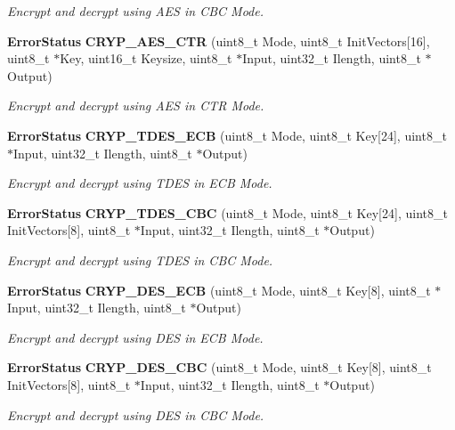 \begin{DoxyCompactItemize}
\begin{DoxyCompactList}\small\item\em Encrypt and decrypt using A\+ES in C\+BC Mode. \end{DoxyCompactList}\item 
\textbf{ Error\+Status} \textbf{ C\+R\+Y\+P\+\_\+\+A\+E\+S\+\_\+\+C\+TR} (uint8\+\_\+t Mode, uint8\+\_\+t Init\+Vectors[16], uint8\+\_\+t $\ast$Key, uint16\+\_\+t Keysize, uint8\+\_\+t $\ast$Input, uint32\+\_\+t Ilength, uint8\+\_\+t $\ast$Output)
\begin{DoxyCompactList}\small\item\em Encrypt and decrypt using A\+ES in C\+TR Mode. \end{DoxyCompactList}\item 
\textbf{ Error\+Status} \textbf{ C\+R\+Y\+P\+\_\+\+T\+D\+E\+S\+\_\+\+E\+CB} (uint8\+\_\+t Mode, uint8\+\_\+t Key[24], uint8\+\_\+t $\ast$Input, uint32\+\_\+t Ilength, uint8\+\_\+t $\ast$Output)
\begin{DoxyCompactList}\small\item\em Encrypt and decrypt using T\+D\+ES in E\+CB Mode. \end{DoxyCompactList}\item 
\textbf{ Error\+Status} \textbf{ C\+R\+Y\+P\+\_\+\+T\+D\+E\+S\+\_\+\+C\+BC} (uint8\+\_\+t Mode, uint8\+\_\+t Key[24], uint8\+\_\+t Init\+Vectors[8], uint8\+\_\+t $\ast$Input, uint32\+\_\+t Ilength, uint8\+\_\+t $\ast$Output)
\begin{DoxyCompactList}\small\item\em Encrypt and decrypt using T\+D\+ES in C\+BC Mode. \end{DoxyCompactList}\item 
\textbf{ Error\+Status} \textbf{ C\+R\+Y\+P\+\_\+\+D\+E\+S\+\_\+\+E\+CB} (uint8\+\_\+t Mode, uint8\+\_\+t Key[8], uint8\+\_\+t $\ast$Input, uint32\+\_\+t Ilength, uint8\+\_\+t $\ast$Output)
\begin{DoxyCompactList}\small\item\em Encrypt and decrypt using D\+ES in E\+CB Mode. \end{DoxyCompactList}\item 
\textbf{ Error\+Status} \textbf{ C\+R\+Y\+P\+\_\+\+D\+E\+S\+\_\+\+C\+BC} (uint8\+\_\+t Mode, uint8\+\_\+t Key[8], uint8\+\_\+t Init\+Vectors[8], uint8\+\_\+t $\ast$Input, uint32\+\_\+t Ilength, uint8\+\_\+t $\ast$Output)
\begin{DoxyCompactList}\small\item\em Encrypt and decrypt using D\+ES in C\+BC Mode. \end{DoxyCompactList}\end{DoxyCompactItemize}


